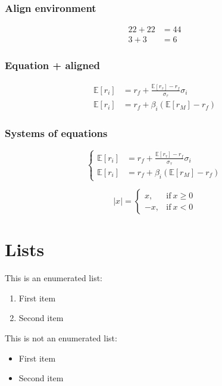 \documentclass[a4paper, 12pt]{article}
\begin{document}
\subsubsection{Align environment}        
\begin{align}
    22+22&=44\\
    3+3&=6
\end{align}

\subsubsection{Equation + aligned}
\begin{equation} 
\label{eq:system}
\begin{aligned}
    \mathbb{E}[r_i]&=r_f+\frac{\mathbb{E}[r_\tau]-r_f}{\sigma_\tau}\sigma_i\\
    \mathbb{E}[r_i]&=r_f+\beta_i(\mathbb{E}[r_M]-r_f)
\end{aligned}
\end{equation}

\subsubsection{Systems of equations}
\[ 
\left\{
    \begin{aligned}
        \mathbb{E}[r_i]&=r_f+\frac{\mathbb{E}[r_\tau]-r_f}{\sigma_\tau}\sigma_i\\
        \mathbb{E}[r_i]&=r_f+\beta_i(\mathbb{E}[r_M]-r_f)
    \end{aligned}
\right.       
\]
        
\[
|x|=
\begin{cases}
    x, &\text{if}\ x \ge 0\\
    -x, &\text{if}\ x<0
\end{cases}
\]

\section{Lists}

\noindent This is an enumerated list:
\begin{enumerate}
    \item First item
    \item Second item
\end{enumerate}

\noindent This is not an enumerated list:
\begin{itemize}
    \item First item
    \item Second item
\end{itemize}
\end{document}
